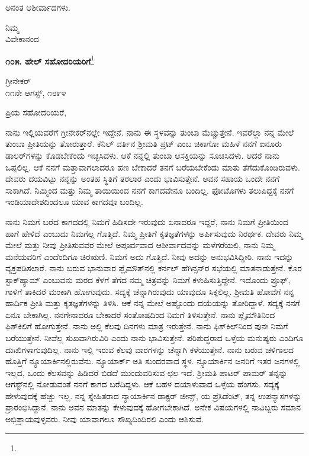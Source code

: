 ಅನಂತ ಆಶೀರ್ವಾದಗಳು.

\vspace{-0.5cm}

{\flushright
ನಿಮ್ಮ\\ವಿವೇಕಾನಂದ\par}

\begin{center}
\textbf{೧೦೫. ಹೇಲ್ ಸಹೋದರಿಯರಿಗೆ}\footnote{}
\end{center}

\vspace{-0.5cm}

\begin{flushright}
ಗ್ರೀನೇಕರ್‌\\೧೧ನೇ ಆಗಸ್ಟ್, ೧೮೯೪
\end{flushright}

\vspace{-0.5cm}

\noindent
ಪ್ರಿಯ ಸಹೋದರಿಯರೆ,

ನಾನು ಇಲ್ಲಿಯವರೆಗೆ ಗ್ರೀನೇಕರ್‌ನಲ್ಲೇ ಇದ್ದೇನೆ. ನಾನು ಈ ಸ್ಥಳವನ್ನು ತುಂಬಾ ಮೆಚ್ಚುತ್ತೇನೆ. ಇವರೆಲ್ಲಾ ನನ್ನ ಮೇಲೆ ತುಂಬಾ ಪ್ರೀತಿಯನ್ನು ತೋರುತ್ತಾರೆ. ಕೆನಿಲ್ ವರ್ತಿನ ಶ‍್ರೀಮತಿ ಪ್ರಟ್ ಎಂಬ ಚಿಕಾಗೋ ಮಹಿಳೆ ನನಗೆ ಐನೂರು ಡಾಲರ್‌ಗಳನ್ನು ಕೊಡಬೇಕೆಂದು ಇಚ್ಛಿಸಿದಳು. ಆಕೆ ನನ್ನಲ್ಲಿ ತುಂಬಾ ಆಸಕ್ತಿಯನ್ನು ಸೂಚಿಸಿದಳು. ಆದರೆ ನಾನು ಒಪ್ಪಲಿಲ್ಲ. ಆಕೆ ನನಗೆ ಮತ್ತಾವಾಗಲಾದರೂ ಹಣ ಬೇಕಾದರೆ ತನಗೆ ಬರೆಯಬೇಕೆಂದು ಮಾತು ತೆಗೆದುಕೊಂಡಿರುವಳು. ದೇವರು ದಯವಿಟ್ಟು ನನ್ನನ್ನು ಅಂತಹ ಸ್ಥಿತಿಗೆ ತರಲಾರ ಎಂದು ಭಾವಿಸುತ್ತೇನೆ. ಅವನ ಸಹಾಯ ಒಂದೇ ನನಗೆ ಸಾಕಾಗಿದೆ. ನಿಮ್ಮಿಂದ ಮತ್ತು ನಿಮ್ಮ ತಾಯಿಯಿಂದ ನನಗೆ ಕಾಗದವೇನೂ ಬಂದಿಲ್ಲ. ಫೋಟೊಗಳು ತಲುಪಿದ್ದಕ್ಕೆ ನನಗೆ ಇಂಡಿಯಾದೇಶದಿಂದಲೂ ಯಾವ ಕಾಗದವೂ ಬಂದಿಲ್ಲ.

ನಾನು ನಿಮಗೆ ಬರೆದ ಕಾಗದದಲ್ಲಿ ನಿಮಗೆ ಹಿಡಿಸದೇ ಇರುವುದು ಏನಾದರೂ ಇದ್ದರೆ, ನಾನು ನಿಮಗೆ ಪ್ರೀತಿಯಿಂದ ಹಾಗೆ ಹೇಳಿದೆ ಎಂಬುದು ನಿಮಗೆಲ್ಲ ಗೊತ್ತಿದೆ. ನಿಮ್ಮ ಪ್ರೀತಿಗೆ ಕೃತಜ್ಞತೆಗಳನ್ನು ಅರ್ಪಿಸುವುದು ನಿರರ್ಥಕ. ದೇವರು ನಿಮ್ಮ ಮೇಲೆ ಮತ್ತು ನೀವು ಪ್ರೀತಿಸುವವರ ಮೇಲೆ ಅಪೂರ್ವವಾದ ಆಶೀರ್ವಾದವನ್ನು ಮಳೆಗರೆಯಲಿ, ನಾನು ನಿಮ್ಮ ಮನೆಯವರಿಗೆ ಎಂದೆಂದಿಗೂ ಚಿರಋಣಿ. ನಿಮಗೆ ಅದು ಗೊತ್ತಿದೆ. ನೀವು ಅದನ್ನು ಅನುಭವಿಸಿದ್ದೀರಿ. ನಾನು ಇದನ್ನು ವ್ಯಕ್ತಪಡಿಸಲಾರೆ. ನಾನು ಬರುವ ಭಾನುವಾರ ಪ್ಲೈಮೌತ್‌ನಲ್ಲಿ ಕರ್ನಲ್ ಹೆಗಿನ್ಸನ್‌ರ  ಸಭೆಯಲ್ಲಿ ಮಾತನಾಡುತ್ತೇನೆ. ಕೊರ ಸ್ಟಾಕ್‌ಹ್ಯಾಮ್ ಎಂಬುವನು ಮರದ ಕೆಳಗೆ ತೆಗೆದ ನಮ್ಮ ಚಿತ್ರವನ್ನು ನಿಮಗೆ ಕಳುಹಿಸುತ್ತಿದ್ದೇನೆ. ಇದೊಂದು ಪ್ರೂಫ್, ಗಾಳಿಗೆ ತಾಕಿದರೆ ಮಂಕಾಗಿ ಹೋಗುವುದು. ಸದ್ಯಕ್ಕೆ ಚೆನ್ನಾಗಿರುವುದು ಯಾವುದೂ ಸಿಕ್ಕಲಿಲ್ಲ. ಶ‍್ರೀಮತಿ ಹೋವೆಗೆ ನನ್ನ ಹಾರ್ದಿಕ ಪ್ರೀತಿ ಮತ್ತು ಕೃತಜ್ಞತೆಗಳನ್ನು ತಿಳಿಸಿ. ಆಕೆ ನನ್ನ ಮೇಲೆ ಅಷ್ಟೊಂದು ದಯೆಯನ್ನು ತೋರಿದ್ದಾಳೆ. ಸದ್ಯಕ್ಕೆ ನನಗೆ ಏನೂ ಬೇಕಾಗಿಲ್ಲ. ನನಗೇನಾದರೂ ಬೇಕಾದರೆ ಸಂತೋಷದಿಂದ ನಿಮಗೆ ತಿಳಿಸುತ್ತೇನೆ. ನಾನು ಪ್ಲೈಮೌತಿನಿಂದ ಫಿಶ್‌ಕಿಲಿಗೆ ಹೋಗುತ್ತೇನೆ. ನಾನು ಅಲ್ಲಿ ಕೆಲವು ದಿನಗಳು ಮಾತ್ರ ಇರುತ್ತೇನೆ. ನಾನು ಫಿಶ್‌ಕಿಲ್‌ನಿಂದ ಪುನಃ ನಿಮಗೆ ಬರೆಯುತ್ತೇನೆ. ನೀವೆಲ್ಲ ಸುಖವಾಗಿರುವಿರಿ ಎಂದು ನಾನು ಭಾವಿಸುತ್ತೇನೆ. ಪರಿಶುದ್ಧರಾದ ಒಳ್ಳೆಯ ಮನುಷ್ಯರು ಎಂದಿಗೂ ದುಃಖಿಗಳಾಗುವುದಿಲ್ಲ. ನಾನು ಇಲ್ಲಿ ಇರುವ ಕೆಲವು ವಾರಗಳನ್ನು ಚೆನ್ನಾಗಿ ಕಳೆಯುತ್ತೇನೆ. ನಾನು ಬರುವ ಚಳಿಗಾಲದ ಹೊತ್ತಿಗೆ ನ್ಯೂಯಾರ್ಕಿನಲ್ಲಿರುವೆನು. ನ್ಯೂಯಾರ್ಕ್ ಅತಿ ಸುಂದರವಾದ ಸ್ಥಳ. ನ್ಯೂಯಾರ್ಕಿನ ಜನರಿಗೆ ಇತರ ಜನಗಳಲ್ಲಿ ಇಲ್ಲದ, ಒಂದು ಕೆಲಸವನ್ನು ಹಿಡಿದರೆ ಬಿಡದೆ ಮುಂದುವರಿಸುವ ಛಲ ಇದೆ. ಶ‍್ರೀಮತಿ ಪಾಟರ್ ಪಾಮರ್‌ ತನ್ನನ್ನು ಆಗಸ್ಟ್‌ನಲ್ಲಿ ನೋಡುವಂತೆ ನನಗೆ ಕಾಗದ ಬರೆದಿದ್ದಳು. ಆಕೆ ಬಹಳ ದಯಾಳುವಾದ ಒಳ್ಳೆಯ ಹೆಂಗಸು. ಸದ್ಯಕ್ಕೆ ಹೇಳುವುದಕ್ಕೆ ಹೆಚ್ಚು ಇಲ್ಲ. ನನ್ನ ಸ್ನೇಹಿತರಾದ ನ್ಯಾಯಾರ್ಕಿನ ಡಾಕ್ಟರ್ ಜೀನ್ಸ್,  ಯ ಪ್ರೆಸಿಡೆಂಟ್, ತನ್ನ ಉಪನ್ಯಾಸಗಳನ್ನು ಪ್ರಾರಂಭಿಸಿದ್ದಾನೆ. ನಾನು ಅವನ ಮಾತನ್ನು ಕೇಳುವುದಕ್ಕೆ ಹೋಗಬೇಕಾಗಿದೆ. ಅನೇಕ ವಿಷಯಗಳಲ್ಲಿ ನಾವಿಬ್ಬರು ಸಮಾನ ಅಭಿಪ್ರಾಯವುಳ್ಳವರು. ನೀವು ಯಾವಾಗಲೂ ಸೌಖ್ಯದಿಂದಿರಲಿ ಎಂದು ಆಶಿಸುವೆ.

